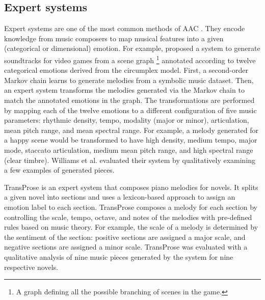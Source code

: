 \subsection{Expert systems}

Expert systems are one of the most common methods of AAC \cite{williams2015investigating}. They encode knowledge from music composers to map musical features into a given (categorical or dimensional) emotion. For example, \citet{williams2015dynamic} proposed a system to generate soundtracks for video games from a scene graph \footnote{A graph defining all the possible branching of scenes in the game.} annotated according to twelve categorical emotions derived from the circumplex model. First, a second-order Markov chain learns to generate melodies from a symbolic music dataset. Then, an expert system transforms the melodies generated via the Markov chain to match the annotated emotions in the graph. The transformations are performed by mapping each of the twelve emotions to a different configuration of five music parameters: rhythmic density, tempo, modality (major or minor), articulation, mean pitch range, and mean spectral range. For example, a melody generated for a happy scene would be transformed to have high density, medium tempo, major mode, staccato articulation, medium mean pitch range, and high spectral range (clear timbre). Williams et al. \cite{williams2015dynamic} evaluated their system by qualitatively examining a few examples of generated pieces.

TransProse \cite{davis2014generating} is an expert system that composes piano melodies for novels. It splits a given novel into sections and uses a lexicon-based approach to assign an emotion label to each section. TransProse composes a melody for each section by controlling the scale, tempo, octave, and notes of the melodies with pre-defined rules based on music theory. For example, the scale of a melody is determined by the sentiment of the section: positive sections are assigned a major scale, and negative sections are assigned a minor scale. TransProse was evaluated with a qualitative analysis of nine music pieces generated by the system for nine respective novels.

